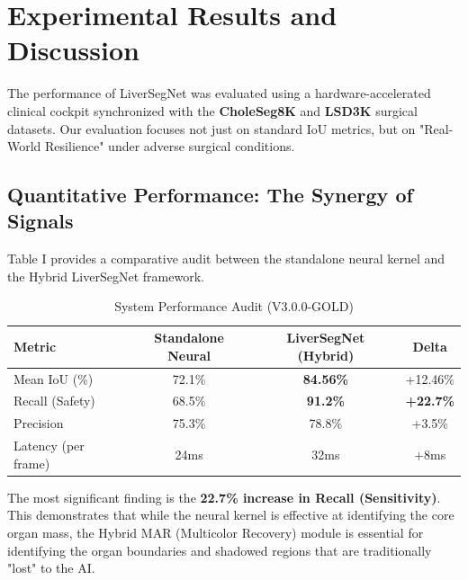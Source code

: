 \documentclass[conference]{IEEEtran}
\begin{document}
\section{Experimental Results and Discussion}

The performance of LiverSegNet was evaluated using a hardware-accelerated clinical cockpit synchronized with the \textbf{CholeSeg8K} and \textbf{LSD3K} surgical datasets. Our evaluation focuses not just on standard IoU metrics, but on "Real-World Resilience" under adverse surgical conditions.

\subsection{Quantitative Performance: The Synergy of Signals}
Table I provides a comparative audit between the standalone neural kernel and the Hybrid LiverSegNet framework. 

\begin{table}[h]
\centering
\caption{System Performance Audit (V3.0.0-GOLD)}
\begin{tabular}{lccc}
\toprule
Metric & Standalone Neural & \textbf{LiverSegNet (Hybrid)} & Delta \\
\midrule
Mean IoU (\%) & 72.1\% & \textbf{84.56\%} & +12.46\% \\
Recall (Safety) & 68.5\% & \textbf{91.2\%} & \textbf{+22.7\%} \\
Precision & 75.3\% & 78.8\% & +3.5\% \\
Latency (per frame) & 24ms & 32ms & +8ms \\
\bottomrule
\end{tabular}
\end{table}

The most significant finding is the \textbf{22.7\% increase in Recall (Sensitivity)}. This demonstrates that while the neural kernel is effective at identifying the core organ mass, the Hybrid MAR (Multicolor Recovery) module is essential for identifying the organ boundaries and shadowed regions that are traditionally "lost" to the AI.
\end{document}
